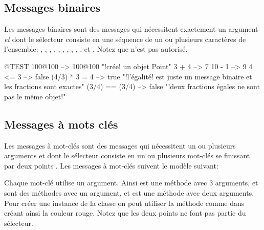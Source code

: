 \documentclass[a4paper,10pt,twoside]{book}
\begin{document}
\subsection{Messages binaires} 
Les messages binaires sont des messages qui n\'ecessitent exactement un argument \emph{et} dont le s\'electeur consiste en une s\'equence de un ou plusieurs caract\`eres de l'ensemble: \ct{+}, \ct{-}, \ct{*}, \ct{/}, \ct{&}, \ct{=}, \ct{>}, \ct{|}, \ct{<}, \ct{~}, et . Notez que \ct{--} n'est pas autoris\'e.

\begin{code}{@TEST}
100@100      --> 100@100  "!cr\'ee! un objet Point"
3 + 4              --> 7
10 - 1            --> 9
4 <= 3            --> false
(4/3) * 3 = 4   --> true  "!l'\'egalit\'e! est juste un message binaire et les fractions sont exactes"
(3/4) == (3/4) --> false  "!deux fractions \'egales ne sont pas le m\^eme objet!"
\end{code}


\subsection{Messages \`a mots cl\'es}

Les messages \`a mot-cl\'es sont des messages qui n\'ecessitent un ou plusieurs arguments et dont le s\'electeur consiste en un ou plusieurs mot-cl\'es se finissant par deux points \ct{:}.  Les messages \`a mot-cl\'es suivent le mod\`ele suivant: 

Chaque mot-cl\'e utilise un argument. Ainsi  est une
m\'ethode avec 3 arguments,  et  sont des
m\'ethodes avec un argument, et  est une m\'ethode avec
deux arguments. Pour cr\'eer une instance de la classe  on
peut utiliser la m\'ethode  comme dans  cr\'eant ainsi la couleur rouge. Notez que les deux points ne
font pas partie du s\'electeur.
\end{document}
